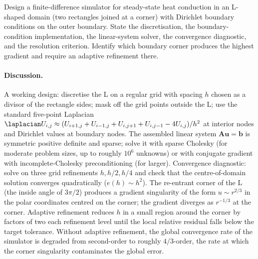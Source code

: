 \begin{exercise}
Design a finite-difference simulator for steady-state heat
conduction in an L-shaped domain (two rectangles joined at a
corner) with Dirichlet boundary conditions on the outer
boundary. State the discretisation, the boundary-condition
implementation, the linear-system solver, the convergence
diagnostic, and the resolution criterion. Identify which
boundary corner produces the highest gradient and require an
adaptive refinement there.

\paragraph{Discussion.}
A working design: discretise the L on a regular grid with spacing
$h$ chosen as a divisor of the rectangle sides; mask off the
grid points outside the L; use the standard five-point Laplacian
$\laplacian U_{i,j} \approx (U_{i+1, j} + U_{i-1, j} + U_{i, j+1}
+ U_{i, j-1} - 4 U_{i, j})/h^{2}$ at interior nodes and Dirichlet
values at boundary nodes. The assembled linear system $\mathbf{A}
\mathbf{u} = \mathbf{b}$ is symmetric positive definite and
sparse; solve it with sparse Cholesky (for moderate problem
sizes, up to roughly $10^{6}$ unknowns) or with conjugate gradient
with incomplete-Cholesky preconditioning (for larger). Convergence
diagnostic: solve on three grid refinements $h, h/2, h/4$ and
check that the centre-of-domain solution converges quadratically
($e(h) \sim h^{2}$). The re-entrant corner of the L (the inside
angle of $3\pi/2$) produces a gradient singularity of the form
$u \sim r^{2/3}$ in the polar coordinates centred on the corner;
the gradient diverges as $r^{-1/3}$ at the corner. Adaptive
refinement reduces $h$ in a small region around the corner by
factors of two each refinement level until the local relative
residual falls below the target tolerance. Without adaptive
refinement, the global convergence rate of the simulator is
degraded from second-order to roughly $4/3$-order, the rate at
which the corner singularity contaminates the global error.
\end{exercise}

